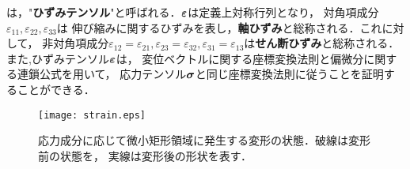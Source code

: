 \documentclass[10pt,a4j]{jbook}
\begin{document}
は，"{\bf ひずみテンソル}"と呼ばれる．$\mbox{\boldmath $\varepsilon$}$は定義上対称行列となり，
対角項成分$\varepsilon_{11},\varepsilon_{22},\varepsilon_{33}$は
伸び縮みに関するひずみを表し，{\bf 軸ひずみ}と総称される．これに対して，
非対角項成分$\varepsilon_{12}=\varepsilon_{21},\varepsilon_{23}=\varepsilon_{32},
\varepsilon_{31}=\varepsilon_{13}$は{\bf せん断ひずみ}と総称される．
また,ひずみテンソル$\mbox{\boldmath $\varepsilon$}$は，
変位ベクトルに関する座標変換法則と偏微分に関する連鎖公式を用いて，
応力テンソル$\mbox{\boldmath $\sigma$}$と同じ座標変換法則に従うことを証明することができる．
\begin{figure}[h]
	\begin{center}
	\texttt{[image: strain.eps]} 
	\end{center}
	\caption{応力成分に応じて微小矩形領域に発生する変形の状態．破線は変形前の状態を，
	実線は変形後の形状を表す．} 
	\label{fig:fig3_1}
\end{figure}
\newpage
\end{document}
